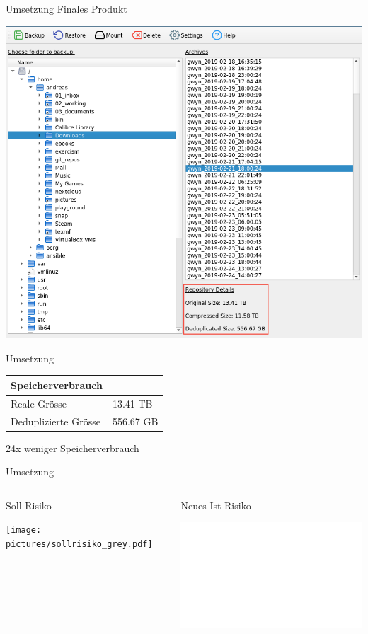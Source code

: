\documentclass[12pt, aspectratio=1610]{beamer}
\begin{document}
\begin{frame}[label={sec:org4d67264}]{Umsetzung}
\alert{Finales Produkt}

\begin{center}
\includegraphics[height=.8\textheight]{pictures/borgqt2.png}%
\end{center}
\end{frame}

\begin{frame}[label={sec:orgf7f766e}]{Umsetzung}
\begin{center}
\begin{tabular}{ll}
\textbf{Speicherverbrauch} & \\
\hline
Reale Grösse & 13.41 TB\\
Deduplizierte Grösse & 556.67 GB\\
\end{tabular}

\end{center}

\begin{center}
24x weniger Speicherverbrauch
\end{center}
\end{frame}

\begin{frame}[label={sec:org816d985}]{Umsetzung}
\begin{columns}
\begin{column}{0.45\columnwidth}
\alert{Soll-Risiko}
\begin{center}
\texttt{[image: pictures/sollrisiko\_grey.pdf]}%
\end{center}
\end{column}

\begin{column}{0.45\columnwidth}
\alert{Neues Ist-Risiko}
\begin{center}
\includegraphics<2->[width=\linewidth]{pictures/ist_risiko_neu.pdf}%
\end{center}
\end{column}
\end{columns}
\end{frame}
\end{document}
